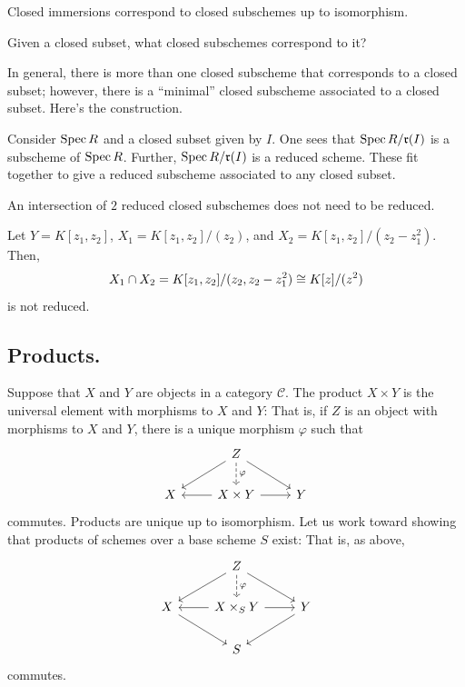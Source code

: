 \documentclass [11 pt, oneside] {article}
\begin{document}
\begin{remark}
	Closed immersions correspond to closed subschemes up to isomorphism.
\end{remark}

\begin{problem}
	Given a closed subset, what closed subschemes correspond to it?
\end{problem}

In general, there is more than one closed subscheme that corresponds to a closed subset; however, there is a ``minimal'' closed subscheme associated to a closed subset. Here's the construction.

Consider $\operatorname{Spec} R$ and a closed subset given by $I$. One sees that $\operatorname{Spec} R/ \mathfrak{r}({I}) $ is a subscheme of $\operatorname{Spec} R$. Further, $\operatorname{Spec} R/\mathfrak{r}({I}) $ is a reduced scheme. These fit together to give a reduced subscheme associated to any closed subset.

\begin{warn}
	An intersection of $2$ reduced closed subschemes does not need to be reduced.
\end{warn}

\begin{example}
Let $Y = K[z_1,z_2]$, $X_1 = K[z_1,z_2]/(z_2)$, and $X_2 = K[z_1,z_2] / (z_2-z_1^2)$. Then, 
\begin{align*}
	X_1\cap X_2 = K[z_1,z_2] / (z_2,z_2-z_1^2) \cong K[z]/(z^2)
\end{align*}
is not reduced.
\end{example}

\subsection{Products.}
Suppose that $X$ and $Y$ are objects in a category $\mathscr{C} $. The product $X\times Y$ is the universal element with morphisms to $X$ and $Y$: That is, if $Z$ is an object with morphisms to $X$ and $Y$, there is a unique morphism $\varphi$ such that
\[
\begin{tikzcd}
	&Z\ar[d,dashed, "\varphi"] \ar[dr]\ar[dl] \\
	X& X\times Y\ar[l]\ar[r]&Y
\end{tikzcd}
\]
commutes.
Products are unique up to isomorphism. Let us work toward showing that products of schemes over a base scheme $S$ exist: That is, as above,
\[
\begin{tikzcd}
	&Z\ar[dl] \ar[dr] \ar[d,dashed,"\varphi"] \\
	X\ar[dr]&X\times_S Y \ar[l]\ar[r] &Y\ar[dl]\\
	 &S
\end{tikzcd}
\]
commutes.
\end{document}
